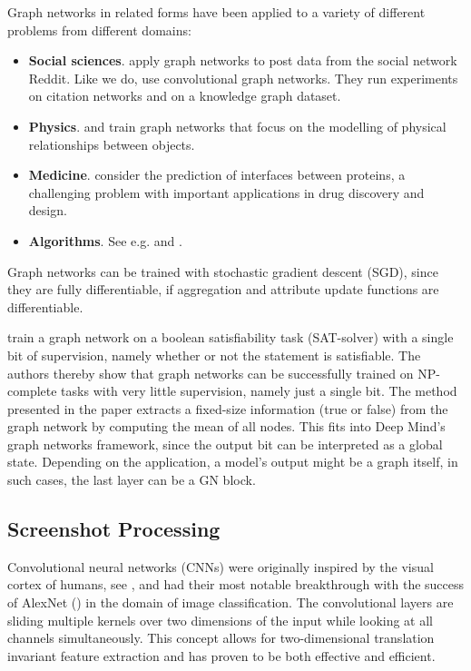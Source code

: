 Graph networks in related forms have been applied to a variety of different problems from different domains:
\begin{itemize}
    \item \textbf{Social sciences}. \cite{graphnetsreddit} apply graph networks to post data from the social network Reddit. Like we do, \cite{graphnetscitationgraph} use convolutional graph networks. They run experiments on citation networks and on a knowledge graph dataset.
    \item \textbf{Physics}. \cite{graphnetsphysicsengine} and \cite{graphnetsphysics2} train graph networks that focus on the modelling of physical relationships between objects.
    \item \textbf{Medicine}. \cite{graphnetsproteininterface} consider the prediction of interfaces between proteins, a challenging problem with important applications in drug discovery and design.
    \item \textbf{Algorithms}. See e.g. \cite{selsam:satsolver} and \cite{dai:graphnetscombinatorialalgo}.
\end{itemize}

Graph networks can be trained with stochastic gradient descent (SGD), since they are fully differentiable, if aggregation and attribute update functions are differentiable.

\cite{selsam:satsolver} train a graph network on a boolean satisfiability task (SAT-solver) with a single bit of supervision, namely whether or not the statement is satisfiable. The authors thereby show that graph networks can be successfully trained on NP-complete tasks with very little supervision, namely just a single bit. The method presented in the paper extracts a fixed-size information (true or false) from the graph network by computing the mean of all nodes. This fits into \cite{deepmind:graphnets} Deep Mind's graph networks framework, since the output bit can be interpreted as a global state. Depending on the application, a model's output might be a graph itself, in such cases, the last layer can be a GN block.


\subsection{Screenshot Processing}
\label{sec:screenshotprocessing}

Convolutional neural networks (CNNs) were originally inspired by the visual cortex of humans, see \cite{lecun:lenet}, and had their most notable breakthrough with the success of AlexNet (\cite{krizhevsky:imagenet}) in the domain of image classification. The convolutional layers are sliding multiple kernels over two dimensions of the input while looking at all channels simultaneously. This concept allows for two-dimensional translation invariant feature extraction and has proven to be both effective and efficient.

